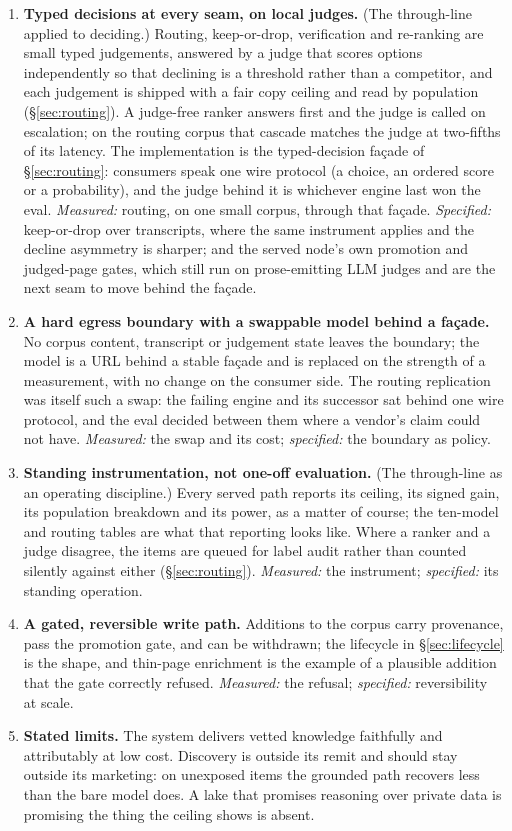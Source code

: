 \documentclass[10pt,twocolumn]{article}
\begin{document}
\begin{enumerate}[topsep=2pt,itemsep=3pt,leftmargin=2em,label=\textbf{D\arabic*}]
\item \textbf{Typed decisions at every seam, on local judges.} (The through-line applied to deciding.) Routing, keep-or-drop, verification and re-ranking are small typed judgements, answered by a judge that scores options independently so that declining is a threshold rather than a competitor, and each judgement is shipped with a fair copy ceiling and read by population (\S\ref{sec:routing}). A judge-free ranker answers first and the judge is called on escalation; on the routing corpus that cascade matches the judge at two-fifths of its latency. The implementation is the typed-decision façade of \S\ref{sec:routing}: consumers speak one wire protocol (a choice, an ordered score or a probability), and the judge behind it is whichever engine last won the eval. \emph{Measured:} routing, on one small corpus, through that façade. \emph{Specified:} keep-or-drop over transcripts, where the same instrument applies and the decline asymmetry is sharper; and the served node's own promotion and judged-page gates, which still run on prose-emitting LLM judges and are the next seam to move behind the façade.
\item \textbf{A hard egress boundary with a swappable model behind a façade.} No corpus content, transcript or judgement state leaves the boundary; the model is a URL behind a stable façade and is replaced on the strength of a measurement, with no change on the consumer side. The routing replication was itself such a swap: the failing engine and its successor sat behind one wire protocol, and the eval decided between them where a vendor's claim could not have. \emph{Measured:} the swap and its cost; \emph{specified:} the boundary as policy.
\item \textbf{Standing instrumentation, not one-off evaluation.} (The through-line as an operating discipline.) Every served path reports its ceiling, its signed gain, its population breakdown and its power, as a matter of course; the ten-model and routing tables are what that reporting looks like. Where a ranker and a judge disagree, the items are queued for label audit rather than counted silently against either (\S\ref{sec:routing}). \emph{Measured:} the instrument; \emph{specified:} its standing operation.
\item \textbf{A gated, reversible write path.} Additions to the corpus carry provenance, pass the promotion gate, and can be withdrawn; the lifecycle in \S\ref{sec:lifecycle} is the shape, and thin-page enrichment is the example of a plausible addition that the gate correctly refused. \emph{Measured:} the refusal; \emph{specified:} reversibility at scale.
\item \textbf{Stated limits.} The system delivers vetted knowledge faithfully and attributably at low cost. Discovery is outside its remit and should stay outside its marketing: on unexposed items the grounded path recovers less than the bare model does. A lake that promises reasoning over private data is promising the thing the ceiling shows is absent.
\end{enumerate}
\end{document}
